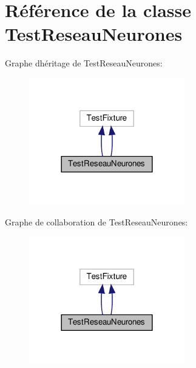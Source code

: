 \hypertarget{classTestReseauNeurones}{}\section{Référence de la classe Test\+Reseau\+Neurones}
\label{classTestReseauNeurones}


Graphe d\textquotesingle{}héritage de Test\+Reseau\+Neurones\+:
\nopagebreak
\begin{figure}[H]
\begin{center}
\leavevmode
\includegraphics[width=192pt]{classTestReseauNeurones__inherit__graph}
\end{center}
\end{figure}


Graphe de collaboration de Test\+Reseau\+Neurones\+:
\nopagebreak
\begin{figure}[H]
\begin{center}
\leavevmode
\includegraphics[width=192pt]{classTestReseauNeurones__coll__graph}
\end{center}
\end{figure}
